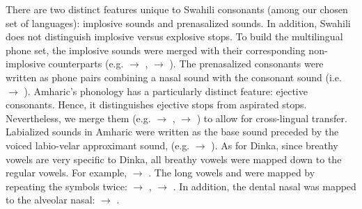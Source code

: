 \documentclass[a4paper]{article}
\begin{document}
There are two distinct features unique to Swahili consonants (among our chosen set of languages): implosive sounds and prenasalized sounds. In addition, Swahili does not distinguish implosive versus explosive stops. To build the multilingual phone set, the implosive sounds were merged with their corresponding non-implosive counterparts (e.g.  $\rightarrow$ ,  $\rightarrow$ ). The prenasalized consonants were written as phone pairs combining a nasal sound with the consonant sound (i.e.  $\rightarrow$  ). Amharic's phonology has a particularly distinct feature: ejective consonants. Hence, it distinguishes ejective stops from aspirated stops. Nevertheless, we merge them (e.g.  $\rightarrow$ ,  $\rightarrow$ ) to allow for cross-lingual transfer. Labialized sounds in Amharic were written as the base sound preceded by the voiced labio-velar approximant sound,  (e.g.  $\rightarrow$  ). As for Dinka, since breathy vowels are very specific to Dinka, all breathy vowels were mapped down to the regular vowels. For example,  $\rightarrow$ . The long vowels  and  were mapped by repeating the symbols twice:  $\rightarrow$ ,  $\rightarrow$ . In addition, the dental nasal was mapped to the alveolar nasal: \textipa{\|[n} $\rightarrow$ .

\end{document}
